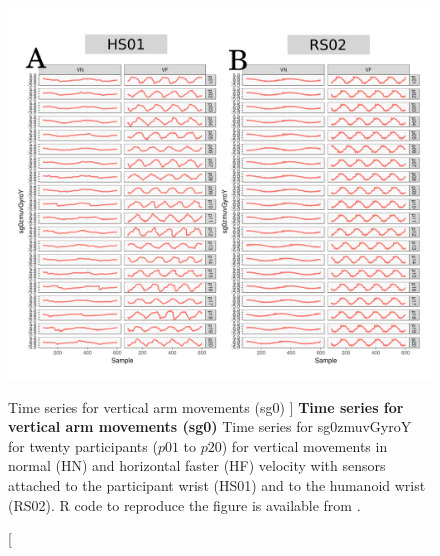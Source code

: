 \begin{figure}
\centering
\includegraphics[width=1.0\textwidth]{aV-sg0}
    	\caption
	[Time series for vertical arm movements (sg0) ]{
	{\bf Time series for vertical arm movements (sg0)}
		Time series for sg0zmuvGyroY for twenty participants 
		($p01$ to  $p20$) 
		for vertical movements in normal (HN) and horizontal faster (HF) 
		velocity with sensors attached to the participant wrist (HS01)
		and to the humanoid wrist (RS02).
	R code to reproduce the figure is available from \cite{hwum2018}.
        }
    \label{fig:aV-sg0}
\end{figure}

